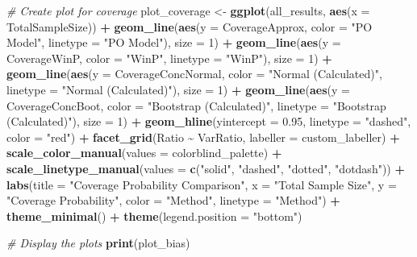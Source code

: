 \documentclass[
  letterpaper,
  DIV=11,
  numbers=noendperiod]{scrartcl}
\newenvironment{Shaded}{\begin{snugshade}}{\end{snugshade}}
\newcommand{\AttributeTok}[1]{\textcolor[rgb]{0.13,0.29,0.53}{#1}}
\newcommand{\CommentTok}[1]{\textcolor[rgb]{0.56,0.35,0.01}{\textit{#1}}}
\newcommand{\DecValTok}[1]{\textcolor[rgb]{0.00,0.00,0.81}{#1}}
\newcommand{\FloatTok}[1]{\textcolor[rgb]{0.00,0.00,0.81}{#1}}
\newcommand{\FunctionTok}[1]{\textcolor[rgb]{0.13,0.29,0.53}{\textbf{#1}}}
\newcommand{\NormalTok}[1]{#1}
\newcommand{\OtherTok}[1]{\textcolor[rgb]{0.56,0.35,0.01}{#1}}
\newcommand{\SpecialCharTok}[1]{\textcolor[rgb]{0.81,0.36,0.00}{\textbf{#1}}}
\newcommand{\StringTok}[1]{\textcolor[rgb]{0.31,0.60,0.02}{#1}}
\begin{document}
\begin{Shaded}
\begin{Highlighting}[]
\CommentTok{\# Create plot for coverage}
\NormalTok{plot\_coverage }\OtherTok{\textless{}{-}} \FunctionTok{ggplot}\NormalTok{(all\_results, }\FunctionTok{aes}\NormalTok{(}\AttributeTok{x =}\NormalTok{ TotalSampleSize)) }\SpecialCharTok{+}
  \FunctionTok{geom\_line}\NormalTok{(}\FunctionTok{aes}\NormalTok{(}\AttributeTok{y =}\NormalTok{ CoverageApprox, }\AttributeTok{color =} \StringTok{"PO Model"}\NormalTok{, }\AttributeTok{linetype =} \StringTok{"PO Model"}\NormalTok{), }\AttributeTok{size =} \DecValTok{1}\NormalTok{) }\SpecialCharTok{+}
  \FunctionTok{geom\_line}\NormalTok{(}\FunctionTok{aes}\NormalTok{(}\AttributeTok{y =}\NormalTok{ CoverageWinP, }\AttributeTok{color =} \StringTok{"WinP"}\NormalTok{, }\AttributeTok{linetype =} \StringTok{"WinP"}\NormalTok{), }\AttributeTok{size =} \DecValTok{1}\NormalTok{) }\SpecialCharTok{+}
  \FunctionTok{geom\_line}\NormalTok{(}\FunctionTok{aes}\NormalTok{(}\AttributeTok{y =}\NormalTok{ CoverageConcNormal, }\AttributeTok{color =} \StringTok{"Normal (Calculated)"}\NormalTok{, }\AttributeTok{linetype =} \StringTok{"Normal (Calculated)"}\NormalTok{), }\AttributeTok{size =} \DecValTok{1}\NormalTok{) }\SpecialCharTok{+}
  \FunctionTok{geom\_line}\NormalTok{(}\FunctionTok{aes}\NormalTok{(}\AttributeTok{y =}\NormalTok{ CoverageConcBoot, }\AttributeTok{color =} \StringTok{"Bootstrap (Calculated)"}\NormalTok{, }\AttributeTok{linetype =} \StringTok{"Bootstrap (Calculated)"}\NormalTok{), }\AttributeTok{size =} \DecValTok{1}\NormalTok{) }\SpecialCharTok{+}
  \FunctionTok{geom\_hline}\NormalTok{(}\AttributeTok{yintercept =} \FloatTok{0.95}\NormalTok{, }\AttributeTok{linetype =} \StringTok{"dashed"}\NormalTok{, }\AttributeTok{color =} \StringTok{"red"}\NormalTok{) }\SpecialCharTok{+}
  \FunctionTok{facet\_grid}\NormalTok{(Ratio }\SpecialCharTok{\textasciitilde{}}\NormalTok{ VarRatio, }\AttributeTok{labeller =}\NormalTok{ custom\_labeller) }\SpecialCharTok{+}
  \FunctionTok{scale\_color\_manual}\NormalTok{(}\AttributeTok{values =}\NormalTok{ colorblind\_palette) }\SpecialCharTok{+}
  \FunctionTok{scale\_linetype\_manual}\NormalTok{(}\AttributeTok{values =} \FunctionTok{c}\NormalTok{(}\StringTok{"solid"}\NormalTok{, }\StringTok{"dashed"}\NormalTok{, }\StringTok{"dotted"}\NormalTok{, }\StringTok{"dotdash"}\NormalTok{)) }\SpecialCharTok{+}
  \FunctionTok{labs}\NormalTok{(}\AttributeTok{title =} \StringTok{"Coverage Probability Comparison"}\NormalTok{,}
       \AttributeTok{x =} \StringTok{"Total Sample Size"}\NormalTok{,}
       \AttributeTok{y =} \StringTok{"Coverage Probability"}\NormalTok{,}
       \AttributeTok{color =} \StringTok{"Method"}\NormalTok{,}
       \AttributeTok{linetype =} \StringTok{"Method"}\NormalTok{) }\SpecialCharTok{+}
  \FunctionTok{theme\_minimal}\NormalTok{() }\SpecialCharTok{+}
  \FunctionTok{theme}\NormalTok{(}\AttributeTok{legend.position =} \StringTok{"bottom"}\NormalTok{)}

\CommentTok{\# Display the plots}
\FunctionTok{print}\NormalTok{(plot\_bias)}
\end{Highlighting}
\end{Shaded}
\end{document}
